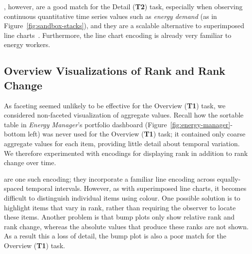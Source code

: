 \documentclass[journal]{vgtc}                %
\newcommand{\bqstart}[1]{\vspace{1mm} \noindent{\textbf{#1}}}
\begin{document}
\bqstart{Faceted line charts}, however, are a good match for the Detail ({\bf T2}) task, especially when observing continuous quantitative time series values such as {\it energy demand} (as in Figure~\ref{fig:sandbox-stacks}), and they are a scalable alternative to superimposed line charts~\cite{Javed2010}. 
Furthermore, the line chart encoding is already very familiar to energy workers.


\subsection{Overview Visualizations of Rank and Rank Change}
\label{design-ranking}


As faceting seemed unlikely to be effective for the Overview ({\bf T1}) task, we considered non-faceted visualization of aggregate values.
Recall how the sortable table in {\it Energy Manager}'s portfolio dashboard (Figure~\ref{fig:energy-manager}-bottom left) was never used for the Overview ({\bf T1}) task; it contained only coarse aggregate values for each item, providing little detail about temporal variation.
We therefore experimented with encodings for displaying rank in addition to rank change over time.

\bqstart{Bump plots} are one such encoding; they incorporate a familiar line encoding across equally-spaced temporal intervals. 
However, as with superimposed line charts, it becomes difficult to distinguish individual items using colour.
One possible solution is to highlight items that vary in rank, rather than requiring the observer to locate these items.
Another problem is that bump plots only show relative rank and rank change, whereas the absolute values that produce these ranks are not shown. 
As a result this a loss of detail, the bump plot is also a poor match for the Overview ({\bf T1}) task.
\end{document}
